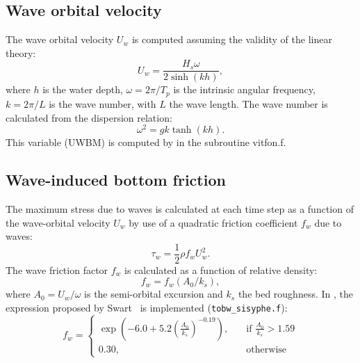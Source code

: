 \subsection{Wave orbital velocity}
The wave orbital velocity $U_w$ is computed assuming the validity of the linear theory:
\begin{equation*}
U_w=\frac{H_s \omega }{2 \sinh (kh)}, 
\end{equation*}
where $h$ is the water depth, $\omega = 2\pi/T_p$ is the intrinsic angular frequency, $k = 2\pi/L$ is the wave number, with $L$ the wave length. The wave number is calculated from the dispersion relation:
\begin{equation*}
\omega^2 = gk\tanh (kh). 
\end{equation*}
This variable ({\ttfamily UWBM}) is computed by \tomawac{} in the subroutine {\ttfamily vitfon.f}.

\subsection{Wave-induced bottom friction}
The maximum stress due to waves is calculated at each time step as a
function of the wave-orbital velocity $U_w$ by use of a quadratic
friction coefficient $f_w$ due to waves:
\begin{equation*}
  \tau_w = \frac{1}{2}\rho f_w U_w^2.
\end{equation*}
The wave friction factor $f_w$ is calculated as a function of relative
density:
\begin{equation*}
f_w = f_w \left( A_0/k_s \right), 
\end{equation*}
where $A_0= U_w/\omega$ is the semi-orbital excursion and $k_s$ the bed roughness.
In \sisyphe{}, the expression proposed by Swart~\cite{Swart} is implemented (\texttt{tobw\_sisyphe.f}):
\begin{equation*}
f_w = \left\{\begin{array}{ll}
\exp \left(-6.0 + 5.2\left( \frac{A_0}{k_s} \right)^{-0.19}\right), & \quad \text{if } \frac{A_0}{k_s} > 1.59\\
0.30, & \quad \text{otherwise}
\end{array}
\right.
\end{equation*}

